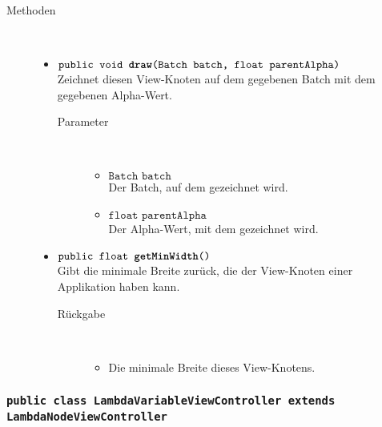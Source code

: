 \begin{description}
\item[Methoden] \hfill \\
	\vspace{-.8cm}
	\begin{itemize}
		\item $\texttt{public void \textbf{draw}(Batch batch, float parentAlpha)}$ \\ Zeichnet diesen View-Knoten auf dem gegebenen Batch mit dem gegebenen Alpha-Wert.
		\begin{description}
			\item[Parameter] \hfill \\
			\vspace{-.8cm}
			\begin{itemize}
				\item $\texttt{Batch batch}$ \\ Der Batch, auf dem gezeichnet wird.
				\item $\texttt{float parentAlpha}$ \\ Der Alpha-Wert, mit dem gezeichnet wird.
			\end{itemize}
		\end{description}
			
		\item $\texttt{public float \textbf{getMinWidth}()}$ \\ Gibt die minimale Breite zurück, die der View-Knoten einer Applikation haben kann.
		\begin{description}
			\item[Rückgabe] \hfill \\
			\vspace{-.8cm}
			\begin{itemize}
				\item Die minimale Breite dieses View-Knotens.
			\end{itemize}
		\end{description}
	\end{itemize}
\end{description}

\subsubsection{\normalfont \texttt{public class \textbf{LambdaVariableViewController} extends LambdaNodeViewController}}

